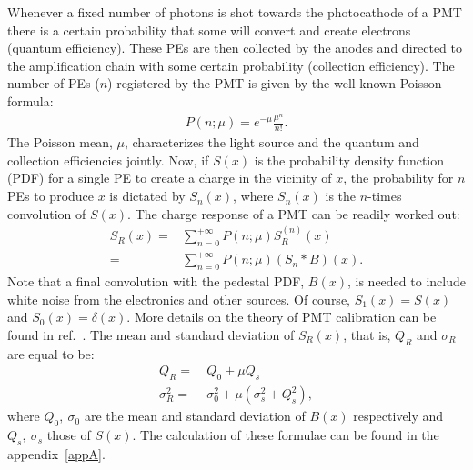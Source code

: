 \documentclass[a4paper,11pt]{article}
\begin{document}
Whenever a fixed number of photons is shot towards the photocathode of a PMT there is a certain probability that some will convert and create electrons (quantum efficiency). 
These PEs are then collected by the anodes and directed to the amplification chain with some certain probability (collection efficiency). 
The number of PEs ($n$) registered by the PMT is given by the well-known Poisson formula:
\begin{align}
P(n;\mu) = e^{-\mu}\frac{\mu^n}{n!}. \label{eq:poisson}
\end{align}
The Poisson mean, $\mu$, characterizes the light source and the quantum and collection efficiencies jointly. 
Now, if $S(x)$ is the probability density function (PDF) for a single PE to create a charge in the vicinity of $x$, 
the probability for $n$ PEs to produce $x$ is dictated by $S_n(x)$, where $S_n(x)$ is the $n$-times convolution of $S(x)$. 
The charge response of a PMT can be readily worked out:
\begin{align}
S_R(x) = &\sum_{n=0}^{+\infty} P(n;\mu)   S^{(n)}_R(x) \nonumber \\
            = & \sum_{n=0}^{+\infty} P(n;\mu) (S_n*B)(x). \label{eq:sr}
\end{align}
Note that a final convolution with the pedestal PDF, $B(x)$, is needed to include white noise from the electronics and other sources. 
Of course, $S_1(x)=S(x)$ and $S_0(x)=\delta(x)$. More details on the theory of PMT calibration can be found in ref.~\cite{me}.
The mean and standard deviation of $S_R(x)$, that is, $Q_R$ and $\sigma_R$ are equal to be:
\begin{align}
Q_R  = & \ Q_0 + \mu Q_s \\
\sigma_R^2      = & \  \sigma_0^2 + \mu( \sigma_s^2 + Q_s^2 ),  
\end{align}
where $Q_0, \ \sigma_0$ are the mean and standard deviation of $B(x)$ respectively and $Q_s, \ \sigma_s$ those of $S(x)$.
The calculation of these formulae can be found in the appendix~\ref{appA}. 
\end{document}
